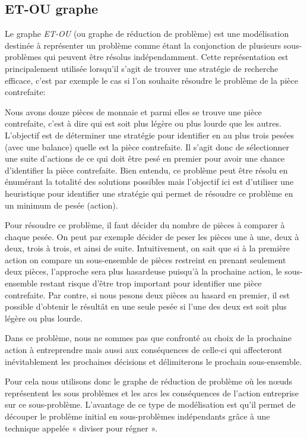 \subsection{ET-OU graphe}
Le graphe \textit{ET-OU} (ou graphe de réduction de problème) est une modélisation destinée à représenter un problème comme étant la conjonction de plusieurs sous-problèmes qui peuvent être résolus indépendamment.
Cette représentation est principalement utilisée lorsqu'il s'agit de trouver une stratégie de recherche efficace, c'est par exemple le cas si l'on souhaite résoudre le problème de la pièce contrefaite:

Nous avons douze pièces de monnaie et parmi elles se trouve une pièce contrefaite, c'est à dire qui est soit plus légère ou plus lourde que les autres. L'objectif est de déterminer une stratégie pour identifier en au plus trois pesées (avec une balance) quelle est la pièce contrefaite. Il s'agit donc de sélectionner une suite d'actions de ce qui doit être pesé en premier pour avoir une chance d'identifier la pièce contrefaite.
Bien entendu, ce problème peut être résolu en énumérant la totalité des solutions possibles mais l'objectif ici est d'utiliser une heuristique pour identifier une stratégie qui permet de résoudre ce problème en un minimum de pesée (action).

Pour résoudre ce problème, il faut décider du nombre de pièces à comparer à chaque pesée. On peut par exemple décider de peser les pièces une à une, deux à deux, trois à trois, et ainsi de suite. Intuitivement, on sait que si à la première action on compare un sous-ensemble de pièces restreint en prenant seulement deux pièces, l'approche sera plus hasardeuse puisqu'à la prochaine action, le sous-ensemble restant risque d'être trop important pour identifier une pièce contrefaite. 
Par contre, si nous pesons deux pièces au hasard en premier, il est possible d'obtenir le résultât en une seule pesée si l'une des deux est soit plus légère ou plus lourde.

Dans ce problème, nous ne sommes pas que confronté au choix de la prochaine action à entreprendre mais aussi aux conséquences de celle-ci qui affecteront inévitablement les prochaines décisions et délimiterons le prochain sous-ensemble.

Pour cela nous utilisons donc le graphe de réduction de problème où les nœuds représentent les sous problèmes et les arcs les conséquences de l'action entreprise sur ce sous-problème. L'avantage de ce type de modélisation est qu'il permet de découper le problème initial en sous-problèmes indépendants grâce à une technique appelée « diviser pour régner ».\\

